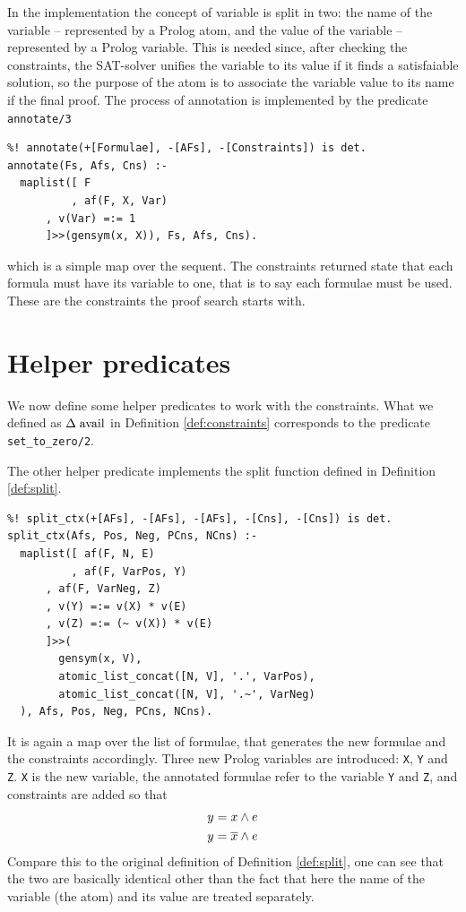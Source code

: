 \documentclass[a4paper, 12pt, english]{report}
\begin{document}
In the implementation the concept of variable is split in two: the name of the variable -- represented by a Prolog atom, and the value of the variable -- represented by a Prolog variable.
This is needed since, after checking the constraints, the SAT-solver unifies the variable to its value if it finds a satisfaiable solution, so the purpose of the atom is to associate the variable value to its name if the final proof.
The process of annotation is implemented by the predicate \texttt{annotate/3}
\begin{verbatim}
%! annotate(+[Formulae], -[AFs], -[Constraints]) is det.
annotate(Fs, Afs, Cns) :-
  maplist([ F
          , af(F, X, Var)
	  , v(Var) =:= 1
	  ]>>(gensym(x, X)), Fs, Afs, Cns).
\end{verbatim}
which is a simple map over the sequent.
The constraints returned state that each formula must have its variable to one, that is to say each formulae must be used.
These are the constraints the proof search starts with.


\section{Helper predicates}\label{sec:helper}
We now define some helper predicates to work with the constraints.
What we defined as $\Delta \; \mathrm{avail}$ in Definition \ref{def:constraints} corresponds to the predicate \texttt{set\_to\_zero/2}.

The other helper predicate implements the split function defined in Definition \ref{def:split}.
\begin{verbatim}
%! split_ctx(+[AFs], -[AFs], -[AFs], -[Cns], -[Cns]) is det.
split_ctx(Afs, Pos, Neg, PCns, NCns) :-
  maplist([ af(F, N, E)
          , af(F, VarPos, Y)
  	  , af(F, VarNeg, Z)
  	  , v(Y) =:= v(X) * v(E)
  	  , v(Z) =:= (~ v(X)) * v(E)
  	  ]>>(
  	    gensym(x, V),
  	    atomic_list_concat([N, V], '.', VarPos),
  	    atomic_list_concat([N, V], '.~', VarNeg)
  ), Afs, Pos, Neg, PCns, NCns).
\end{verbatim}
It is again a map over the list of formulae, that generates the new formulae and the constraints accordingly.
Three new Prolog variables are introduced: \texttt{X}, \texttt{Y} and \texttt{Z}.
\texttt{X} is the new variable, the annotated formulae refer to the variable \texttt{Y} and \texttt{Z}, and constraints are added so that
\begin{align*}
	y &= x \wedge e \\
	y &= \overline{x} \wedge e \\
\end{align*}
Compare this to the original definition of Definition \ref{def:split}, one can see that the two are basically identical other than the fact that here the name of the variable (the atom) and its value are treated separately.
\end{document}
